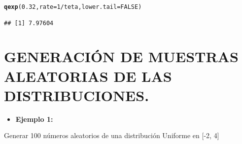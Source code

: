 \documentclass[12pt,letterpaper]{article}\usepackage[]{graphicx}\usepackage[]{color}
\makeatletter
\newcommand{\hlnum}[1]{\textcolor[rgb]{0.686,0.059,0.569}{#1}}%
\newcommand{\hlopt}[1]{\textcolor[rgb]{0,0,0}{#1}}%
\newcommand{\hlstd}[1]{\textcolor[rgb]{0.345,0.345,0.345}{#1}}%
\newcommand{\hlkwc}[1]{\textcolor[rgb]{0.333,0.667,0.333}{#1}}%
\newcommand{\hlkwd}[1]{\textcolor[rgb]{0.737,0.353,0.396}{\textbf{#1}}}%
\newenvironment{kframe}{%
 \def\at@end@of@kframe{}%
 \ifinner\ifhmode%
  \def\at@end@of@kframe{\end{minipage}}%
  \begin{minipage}{\columnwidth}%
 \fi\fi%
 \def\FrameCommand##1{\hskip\@totalleftmargin \hskip-\fboxsep
 \colorbox{shadecolor}{##1}\hskip-\fboxsep
     \hskip-\linewidth \hskip-\@totalleftmargin \hskip\columnwidth}%
 \MakeFramed {\advance\hsize-\width
   \@totalleftmargin\z@ \linewidth\hsize
   \@setminipage}}%
 {\par\unskip\endMakeFramed%
 \at@end@of@kframe}
\newenvironment{knitrout}{}{} %
\makeatother
\begin{document}
\begin{description}
\begin{knitrout}
\begin{kframe}
\begin{alltt}
\hlkwd{qexp}\hlstd{(}\hlnum{0.32}\hlstd{,} \hlkwc{rate}\hlstd{=}\hlnum{1}\hlopt{/}\hlstd{teta,} \hlkwc{lower.tail}\hlstd{=}\hlnum{FALSE}\hlstd{)}
\end{alltt}
\begin{verbatim}
## [1] 7.97604
\end{verbatim}
\end{kframe}
\end{knitrout}
\end{description}

\newpage

\section{GENERACI\'ON DE MUESTRAS ALEATORIAS DE LAS DISTRIBUCIONES.} 


\begin{itemize}
  \item \textbf{Ejemplo 1:}
\end{itemize}
Generar 100 n\'umeros aleatorios de una distribuci\'on Uniforme en [-2, 4]
\end{document}
